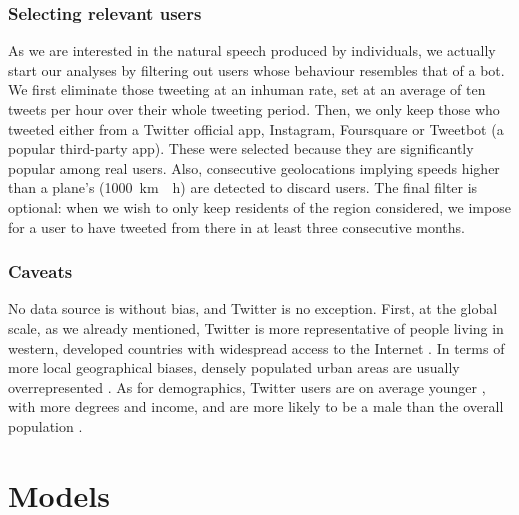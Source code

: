 \documentclass[../thesis.tex]{subfiles}
\begin{document}
\subsubsection{Selecting relevant users}
\label{sec:method_users_select}
As we are interested in the natural speech produced by individuals, we actually start
our analyses by filtering out users whose behaviour resembles that of a bot. We first
eliminate those tweeting at an inhuman rate, set at an average of ten tweets per hour
over their whole tweeting period. Then, we only keep those who tweeted either from a
Twitter official app, Instagram, Foursquare or Tweetbot (a popular third-party app).
These were selected because they are significantly popular among real users. Also,
consecutive geolocations implying speeds higher than a plane's (\SI{1000}{\kilo \meter
\per \hour}) are detected to discard users. The final filter is optional: when we wish
to only keep residents of the region considered, we impose for a user to have tweeted
from there in at least three consecutive months.


\subsubsection{Caveats}
No data source is without bias, and Twitter is no exception. First, at the global scale,
as we already mentioned, Twitter is more representative of people living in western,
developed countries with widespread access to the Internet
\cite{HawelkaGeolocatedTwitter2014}. In terms of more local geographical biases, densely
populated urban areas are usually overrepresented
\cite{MisloveUnderstandingDemographics2011,JiangUnderstandingDemographic2019,AuxierSocialMedia2021}.
As for demographics, Twitter users are on average younger
\cite{NguyenHowOld2013,AuxierSocialMedia2021}, with more degrees and income, and are
more likely to be a male than the overall population
\cite{MisloveUnderstandingDemographics2011,AuxierSocialMedia2021}.




\section{Models}
\end{document}
